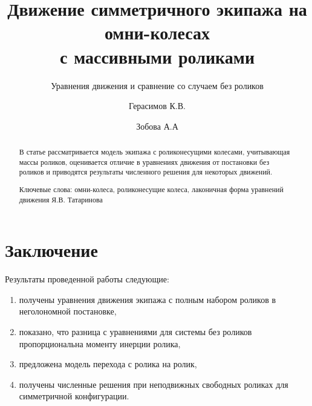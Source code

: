 \title{Движение симметричного экипажа на омни-колесах\\с массивными роликами}
\subtitle{Уравнения движения и сравнение со случаем без роликов}

\author{Герасимов К.В. \and
        Зобова А.А
}


\maketitle

\begin{abstract}
В статье рассматривается модель экипажа с роликонесущими колесами, учитывающая массы роликов, оценивается отличие в уравнениях движения от постановки без роликов и приводятся результаты численного решения для некоторых движений.

Ключевые слова: омни-колеса, роликонесущие колеса, лаконичная форма уравнений движения Я.В. Татаринова

\end{abstract}

\newpage















\section{Заключение}

Результаты проведенной работы следующие:
\begin{enumerate}
    \item получены уравнения движения экипажа с полным набором роликов в неголономной постановке,

    \item показано, что разница с уравнениями для системы без роликов пропорциональна моменту инерции ролика,

    \item предложена модель перехода с ролика на ролик,

    \item получены численные решения при неподвижных свободных роликах для симметричной конфигурации.
\end{enumerate}

